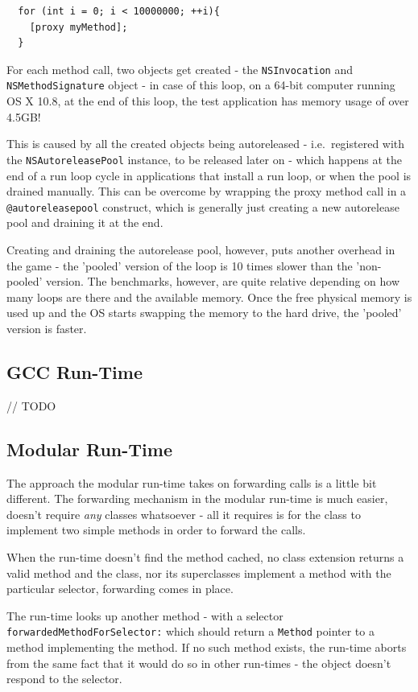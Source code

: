 \begin{verbatim}
  for (int i = 0; i < 10000000; ++i){
    [proxy myMethod];
  }
\end{verbatim}

For each method call, two objects get created - the \verb=NSInvocation= \newline{}and \verb=NSMethodSignature= object - in case of this loop, on a 64-bit computer running OS X 10.8, at the end of this loop, the test application has memory usage of over 4.5GB!

This is caused by all the created objects being autoreleased - i.e.\ registered with the \verb=NSAutoreleasePool= instance, to be released later on - which happens at the end of a run loop cycle in applications that install a run loop, or when the pool is drained manually. This can be overcome by wrapping the proxy method call in a \verb=@autoreleasepool= construct, which is generally just creating a new autorelease pool and draining it at the end.

Creating and draining the autorelease pool, however, puts another overhead in the game - the 'pooled' version of the loop is 10 times slower than the 'non-pooled' version. The benchmarks, however, are quite relative depending on how many loops are there and the available memory. Once the free physical memory is used up and the OS starts swapping the memory to the hard drive, the 'pooled' version is faster.

\subsection{GCC Run-Time}

// TODO

\subsection{Modular Run-Time}
 
The approach the modular run-time takes on forwarding calls is a little bit different. The forwarding mechanism in the modular run-time is much easier, doesn't require \emph{any} classes whatsoever - all it requires is for the class to implement two simple methods in order to forward the calls.

When the run-time doesn't find the method cached, no class extension returns a valid method and the class, nor its superclasses implement a method with the particular selector, forwarding comes in place.

The run-time looks up another method - with a selector \verb=forwardedMethodForSelector:= which should return a \verb=Method= pointer to a method implementing the method. If no such method exists, the run-time aborts from the same fact that it would do so in other run-times - the object doesn't respond to the selector.

